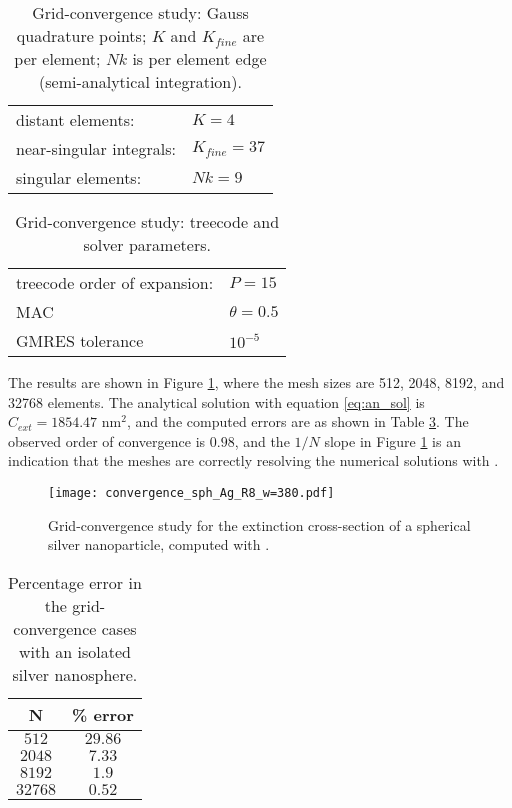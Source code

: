 \begin{table}[h]
    \centering
    \caption{\label{table:quadparams1} Grid-convergence study: Gauss quadrature points; 
    $K$ and $K_{fine}$ are per element; $Nk $ is per element edge (semi-analytical integration). } 
    \begin{tabular}{l l}
    \hline%
     distant elements: & $K=4$ \\
     near-singular integrals:   & $ K_{fine}=37$ \\
     singular elements:  & $Nk =9$ \\
    \hline%
    \end{tabular}
\end{table}


\begin{table}[h]
    \centering
    \caption{\label{table:treeparams1} Grid-convergence study: treecode and solver parameters.} 
    \begin{tabular}{l l}
    \hline%
    treecode order of expansion: & $P=15$\\
    MAC                                         & $\theta=0.5$\\
    GMRES tolerance                    & $10^{-5}$\\
    \hline%
    \end{tabular}
\end{table}

The results are shown in Figure \ref{fig:error_sphere_Ag}, where the mesh sizes are
512, 2048, 8192, and 32768 elements. 
The analytical solution with equation \eqref{eq:an_sol} is $C_{ext} = 1854.47$ nm$^2$, 
and the computed errors are as shown in Table \ref{table:err_iso_sphere}.
The observed order of convergence is $0.98$, and the $1/N$ slope in Figure \ref{fig:error_sphere_Ag}
is an indication that the meshes are correctly resolving the numerical solutions with \pygbe. 


\begin{figure}[h] %
   \centering
   \texttt{[image: convergence\_sph\_Ag\_R8\_w=380.pdf]} 
   \caption{Grid-convergence study for the extinction cross-section of a spherical silver
            nanoparticle, computed with \pygbe.}
   \label{fig:error_sphere_Ag}
\end{figure}



\begin{table}[h]
    \centering
    \caption{\label{table:err_iso_sphere} Percentage error in the grid-convergence cases with an isolated silver nanosphere.} 
    \begin{tabular}{c c}
    \hline%
    N & \% error \\
    \hline%
     $512$ & $29.86$ \\
     $2048$ & $7.33$ \\
     $8192$ & $1.9$ \\
     $32768$ & $0.52$ \\
    \hline%
    \end{tabular}
\end{table}

